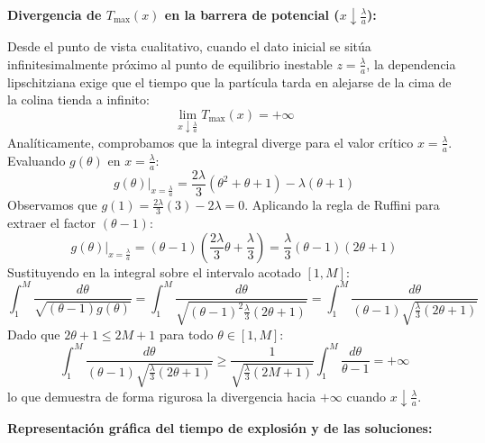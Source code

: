 {\begin{itemize}
        \medskip

        \textbf{Divergencia de $T_{\max}(x)$ en la barrera de potencial ($x \downarrow \frac{\lambda}{a}$):}

        Desde el punto de vista cualitativo, cuando el dato inicial se sitúa infinitesimalmente próximo al punto de equilibrio inestable $z = \frac{\lambda}{a}$, la dependencia lipschitziana exige que el tiempo que la partícula tarda en alejarse de la cima de la colina tienda a infinito:
        \[
            \lim_{x \downarrow \frac{\lambda}{a}} T_{\max}(x) = +\infty
        \]
        Analíticamente, comprobamos que la integral diverge para el valor crítico $x = \frac{\lambda}{a}$. Evaluando $g(\theta)$ en $x = \frac{\lambda}{a}$:
        \[
            g(\theta)\Big|_{x = \frac{\lambda}{a}} = \frac{2\lambda}{3}(\theta^2 + \theta + 1) - \lambda(\theta + 1)
        \]
        Observamos que $g(1) = \frac{2\lambda}{3}(3) - 2\lambda = 0$. Aplicando la regla de Ruffini para extraer el factor $(\theta - 1)$:
        \[
            g(\theta)\Big|_{x = \frac{\lambda}{a}} = (\theta - 1)\left( \frac{2\lambda}{3}\theta + \frac{\lambda}{3} \right) = \frac{\lambda}{3}(\theta - 1)(2\theta + 1)
        \]
        Sustituyendo en la integral sobre el intervalo acotado $[1, M]$:
        \[
            \int_1^M \frac{d\theta}{\sqrt{(\theta - 1)g(\theta)}} = \int_1^M \frac{d\theta}{\sqrt{(\theta - 1)^2 \frac{\lambda}{3}(2\theta + 1)}} = \int_1^M \frac{d\theta}{(\theta - 1)\sqrt{\frac{\lambda}{3}(2\theta + 1)}}
        \]
        Dado que $2\theta + 1 \leq 2M + 1$ para todo $\theta \in [1, M]$:
        \[
            \int_1^M \frac{d\theta}{(\theta - 1)\sqrt{\frac{\lambda}{3}(2\theta + 1)}} \geq \frac{1}{\sqrt{\frac{\lambda}{3}(2M + 1)}} \int_1^M \frac{d\theta}{\theta - 1} = +\infty
        \]
        lo que demuestra de forma rigurosa la divergencia hacia $+\infty$ cuando $x \downarrow \frac{\lambda}{a}$.

        \medskip

        \textbf{Representación gráfica del tiempo de explosión y de las soluciones:}

        \begin{center}
\end{center}
\end{itemize}}
